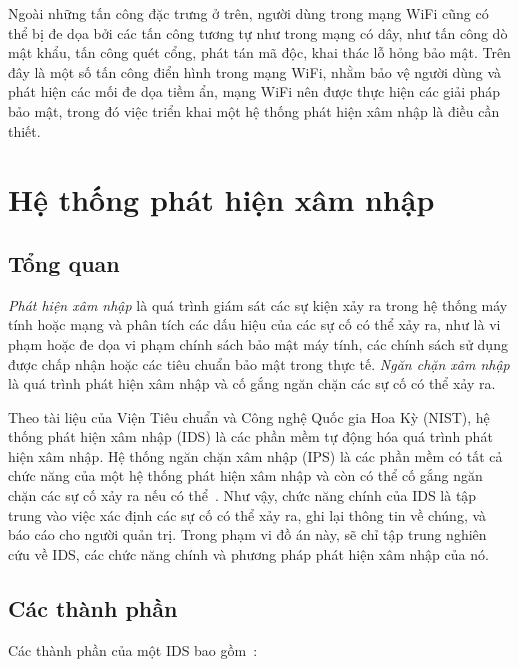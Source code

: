 \begin{leftbar}
\noindent Ngoài những tấn công đặc trưng ở trên, người dùng trong mạng WiFi cũng có thể bị đe dọa bởi các tấn công tương tự như trong mạng có dây, như tấn công dò mật khẩu, tấn công quét cổng, phát tán mã độc, khai thác lỗ hỏng bảo mật. Trên đây là một số tấn công điển hình trong mạng WiFi, nhằm bảo vệ người dùng và phát hiện các mối đe dọa tiềm ẩn, mạng WiFi nên được thực hiện các giải pháp bảo mật, trong đó việc triển khai một hệ thống phát hiện xâm nhập là điều cần thiết.
\end{leftbar}

\section{Hệ thống phát hiện xâm nhập}
\subsection{Tổng quan}
\emph{Phát hiện xâm nhập} là quá trình giám sát các sự kiện xảy ra trong hệ thống máy tính hoặc mạng và phân tích các dấu hiệu của các sự cố có thể xảy ra, như là vi phạm hoặc đe dọa vi phạm chính sách bảo mật máy tính, các chính sách sử dụng được chấp nhận hoặc các tiêu chuẩn bảo mật trong thực tế. \emph{Ngăn chặn xâm nhập} là quá trình phát hiện xâm nhập và cố gắng ngăn chặn các sự cố có thể xảy ra. 

Theo tài liệu của Viện Tiêu chuẩn và Công nghệ Quốc gia Hoa Kỳ (NIST), hệ thống phát hiện xâm nhập (IDS) là các phần mềm tự động hóa quá trình phát hiện xâm nhập. Hệ thống ngăn chặn xâm nhập (IPS) là các phần mềm có tất cả chức năng của một hệ thống phát hiện xâm nhập và còn có thể cố gắng ngăn chặn các sự cố xảy ra nếu có thể~\cite{scarfone2007guide}. Như vậy, chức năng chính của IDS là tập trung vào việc xác định các sự cố có thể xảy ra, ghi lại thông tin về chúng, và báo cáo cho người quản trị. Trong phạm vi đồ án này, sẽ chỉ tập trung nghiên cứu về IDS, các chức năng chính và phương pháp phát hiện xâm nhập của nó.

\subsection{Các thành phần}
Các thành phần của một IDS bao gồm~\cite{scarfone2007guide}:


